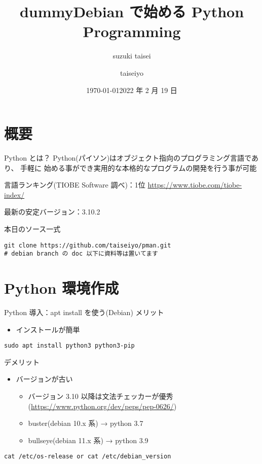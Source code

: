 \documentclass[compress,dvipdfmx,11pt]{beamer}
\author{suzuki taisei}
\date{\today}
\title{dummy}
\title[2022 年度 2 月 Debian 勉強会]{\bf Debian で始める Python Programming}
\author[]{taiseiyo}
\date{2022 年 2 月 19 日}
\begin{document}
\maketitle
\newcommand{\pivec}{\mathbf \pi}
\newcommand{\xvec}{\mathbf x}
\newcommand{\yvec}{\mathbf y}
\newcommand{\zvec}{\mathbf z}
\newcommand{\Emat}{\mathbf E}
\newcommand{\Imat}{\mathbf I}

\section{概要}
\label{sec:org126cd04}
\begin{frame}[label={sec:orgbdf2805},fragile]{Python とは？}
 Python(パイソン)はオブジェクト指向のプログラミング言語であり、 \alert{手軽に
始める事ができ実用的な本格的なプログラムの開発を行う事が可能}


言語ランキング(TIOBE Software 調べ)：1位
\url{https://www.tiobe.com/tiobe-index/}


最新の安定バージョン：3.10.2



本日のソース一式
\begin{verbatim}
git clone https://github.com/taiseiyo/pman.git
# debian branch の doc 以下に資料等は置いてます
\end{verbatim}
\end{frame}

\section{Python 環境作成}
\label{sec:org421b938}
\begin{frame}[label={sec:orga69ff9c},fragile]{Python 導入：apt install を使う(Debian)}
 メリット
\begin{itemize}
\item インストールが簡単
\end{itemize}
\begin{verbatim}
sudo apt install python3 python3-pip
\end{verbatim}

デメリット
\begin{itemize}
\item バージョンが古い
\begin{itemize}
\item バージョン 3.10 以降は文法チェッカーが優秀(\url{https://www.python.org/dev/peps/pep-0626/})
\item buster(debian 10.x 系) → python 3.7
\item bullseye(debian 11.x 系) → python 3.9
\end{itemize}
\end{itemize}


\vspace{-2truemm}      
\begin{verbatim}
cat /etc/os-release or cat /etc/debian_version
\end{verbatim}
\end{frame}
\end{document}

